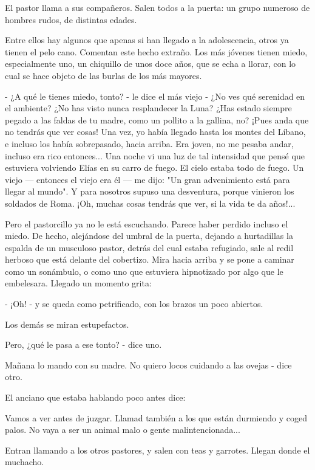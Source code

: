 \documentclass[12pt]{book} %
\begin{document}
El pastor llama a sus compañeros. Salen todos a la puerta: un grupo numeroso de hombres rudos, de distintas edades. 

Entre ellos hay algunos que apenas si han llegado a la adolescencia, otros ya tienen el pelo cano. Comentan este hecho extraño. Los más jóvenes tienen miedo, especialmente uno, un chiquillo de unos doce años, que se echa a llorar, con lo cual se hace objeto de las burlas de los más mayores. 

- ¿A qué le tienes miedo, tonto? - le dice el más viejo - ¿No ves qué serenidad en el ambiente? ¿No has visto nunca resplandecer la Luna? ¿Has estado siempre pegado a las faldas de tu madre, como un pollito a la gallina, no? ¡Pues anda que no tendrás que ver cosas! Una vez, yo había llegado hasta los montes del Líbano, e incluso los había sobrepasado, hacia arriba. Era joven, no me pesaba andar, incluso era rico entonces... Una noche vi una luz de tal intensidad que pensé que estuviera volviendo Elías en su carro de fuego. El cielo estaba todo de fuego. Un viejo — entonces el viejo era él — me dijo: "Un gran advenimiento está para llegar al mundo". Y para nosotros supuso una desventura, porque vinieron los soldados de Roma. ¡Oh, muchas cosas tendrás que ver, si la vida te da años!... 

Pero el pastorcillo ya no le está escuchando. Parece haber perdido incluso el miedo. De hecho, alejándose del umbral de la puerta, dejando a hurtadillas la espalda de un musculoso pastor, detrás del cual estaba refugiado, sale al redil herboso que está delante del cobertizo. Mira hacia arriba y se pone a caminar como un sonámbulo, o como uno que estuviera hipnotizado por algo que le embelesara. Llegado un momento grita: 

- ¡Oh! - y se queda como petrificado, con los brazos un poco abiertos. 

Los demás se miran estupefactos. 

Pero, ¿qué le pasa a ese tonto? - dice uno. 

Mañana lo mando con su madre. No quiero locos cuidando a las ovejas - dice otro. 

El anciano que estaba hablando poco antes dice: 

Vamos a ver antes de juzgar. Llamad también a los que están durmiendo y coged palos. No vaya a ser un animal malo o gente malintencionada... 

Entran llamando a los otros pastores, y salen con teas y garrotes. Llegan donde el muchacho. 
\end{document}
